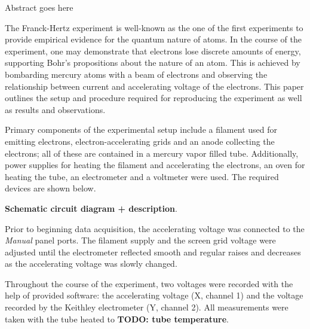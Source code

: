 
\physics

\begin{paperabs}

	Abstract goes here
	
\end{paperabs}

\begin{paper}
	
	
	The Franck-Hertz experiment is well-known as the one of the first experiments to provide empirical evidence for the quantum nature of atoms. In the course of the experiment, one may demonstrate that electrons lose discrete amounts of energy, supporting Bohr's propositions about the nature of an atom. This is achieved by bombarding mercury atoms with a beam of electrons and observing the relationship between current and accelerating voltage of the electrons. This paper outlines the setup and procedure required for reproducing the experiment as well as results and observations. 
	
	Primary components of the experimental setup include a filament used for emitting electrons, electron-accelerating grids and an anode collecting the electrons; all of these are contained in a mercury vapor filled tube. Additionally, power supplies for heating the filament and accelerating the electrons, an oven for heating the tube, an electrometer and a voltmeter were used. The required devices are shown below.
	

	\textbf{Schematic circuit diagram + description}.

	Prior to beginning data acquisition, the accelerating voltage was connected to the \textit{Manual} panel ports. The filament supply and the screen grid voltage were adjusted until the electrometer reflected smooth and regular raises and decreases as the accelerating voltage was slowly changed. 
	
	Throughout the course of the experiment, two voltages were recorded with the help of provided software: the accelerating voltage (X, channel 1) and the voltage recorded by the Keithley electrometer (Y, channel 2). All measurements were taken with the tube heated to \textbf{TODO: tube temperature}.


\end{paper}
